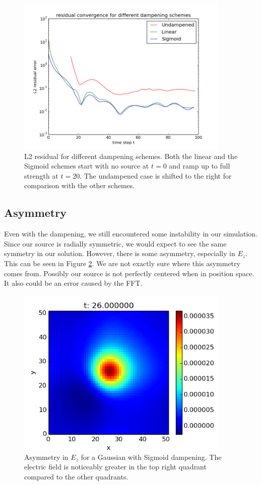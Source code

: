\documentclass{article}
\begin{document}
	\begin{figure}
		\centering
		\includegraphics[width=4in]{conv_plot_100}
		\caption{L2 residual for different dampening schemes. Both the linear and the Sigmoid schemes start with no source at $t=0$ and ramp up to full strength at $t=20$. The undampened case is shifted to the right for comparison with the other schemes.}
		\label{fig:residual}
	\end{figure} 
	
	\subsection{Asymmetry}
	Even with the dampening, we still encountered some instability in our simulation. Since our source is radially symmetric, we would expect to see the same symmetry in our solution. However, there is some asymmetry, especially in $E_z$. This can be seen in Figure \ref{fig:asymmetry}. We are not exactly sure where this asymmetry comes from. Possibly our source is not perfectly centered when in position space. It also could be an error caused by the FFT.
	\begin{figure}
		\centering
		\includegraphics[width=4in]{asymmetry}
		\caption{Asymmetry in $E_z$ for a Gaussian with Sigmoid dampening. The electric field is noticeably greater in the top right quadrant compared to the other quadrants.}
		\label{fig:asymmetry}
	\end{figure} 
\end{document}
